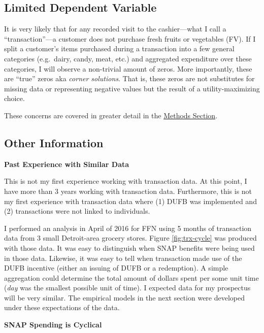\documentclass[12pt,letterpaperpaper,]{book}
\begin{document}
\subsection*{Limited Dependent
Variable}\label{limited-dependent-variable}

It is very likely that for any recorded visit to the cashier---what I
call a ``transaction''---a customer does not purchase fresh fruits or
vegetables (FV). If I split a customer's items purchased during a
transaction into a few general categories (e.g.~dairy, candy, meat,
etc.) and aggregated expenditure over these categories, I will observe a
non-trivial amount of zeros. More importantly, these are ``true'' zeros
aka \emph{corner solutions}. That is, these zeros are not substitutes
for missing data or representing negative values but the result of a
utility-maximizing choice.

These concerns are covered in greater detail in the
\protect\hyperlink{methods-1}{Methods Section}.

\subsection*{Other Information}\label{other-information}

\textbf{Past Experience with Similar Data}

This is not my first experience working with transaction data. At this
point, I have more than 3 years working with transaction data.
Furthermore, this is not my first experience with transaction data where
(1) DUFB was implemented and (2) transactions were not linked to
individuals.

I performed an analysis in April of 2016 for FFN using 5 months of
transaction data from 3 small Detroit-area grocery stores. Figure
\ref{fig:trx-cycle} was produced with those data. It was easy to
distinguish when SNAP benefits were being used in those data. Likewise,
it was easy to tell when transaction made use of the DUFB incentive
(either an issuing of DUFB or a redemption). A simple aggregation could
determine the total amount of dollars spent per some unit time
(\emph{day} was the smallest possible unit of time). I expected data for
my prospectus will be very similar. The empirical models in the next
section were developed under these expectations of the data.

\textbf{SNAP Spending is Cyclical}
\end{document}
